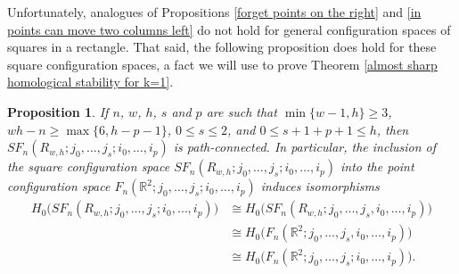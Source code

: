 \documentclass[pagebackref,colorlinks,citecolor=blue,linkcolor=blue,urlcolor=blue,filecolor=blue]{article}
\newtheorem{prop}[thm]{Proposition}
\theoremstyle{definition}\newtheorem{definition}[thm]{Definition}
\theoremstyle{definition}
\newcommand{\R}{\ensuremath{\mathbb{R}}}
\begin{document}
Unfortunately, analogues of Propositions \ref{forget points on the right} and \ref{in points can move two columns left} do not hold for general configuration spaces of squares in a rectangle.
That said, the following proposition does hold for these square configuration spaces, a fact we will use to prove Theorem \ref{almost sharp homological stability for k=1}.

\begin{prop}\label{connected double right configuration space}
If $n$, $w$, $h$, $s$ and $p$ are such that $\min\{w-1,h\}\ge 3$, $wh-n\ge \max\{6, h-p-1\}$, 
$0\le s\le 2$, and $0\le s+1+p+1\le h$, then $SF_{n}(R_{w,h}; j_{0}, \dots, j_{s};i_{0}, \dots, i_{p})$ is path-connected.
In particular, the inclusion of the square configuration space $SF_{n}(R_{w,h}; j_{0}, \dots, j_{s};i_{0}, \dots, i_{p})$ into the point configuration space $F_{n}(\R^{2}; j_{0}, \dots, j_{s};i_{0}, \dots, i_{p})$ induces isomorphisms
\begin{align*}
H_{0}\big(SF_{n}(R_{w,h}; j_{0}, \dots, j_{s};i_{0}, \dots, i_{p})\big)&\cong H_{0}\big(SF_{n}(R_{w,h}; j_{0}, \dots, j_{s}, i_{0}, \dots, i_{p})\big)\\
&\cong H_{0}\big(F_{n}(\R^{2}; j_{0},\dots, j_{s}, i_{0}, \dots, i_{p})\big)\\
&\cong H_{0}\big(F_{n}(\R^{2}; j_{0}, \dots, j_{s}; i_{0}, \dots, i_{p})\big).
\end{align*}
\end{prop}
\end{document}
